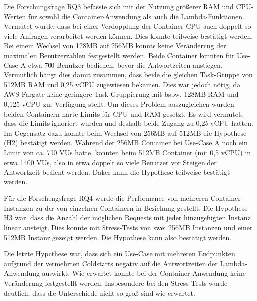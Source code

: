 Die Forschungsfrage RQ3 befasste sich mit der Nutzung größerer RAM und CPU-Werten für sowohl die Container-Anwendung als auch die Lambda-Funktionen. Vermutet wurde, dass bei einer Verdopplung der Container-CPU auch doppelt so viele Anfragen verarbeitet werden können. Dies konnte teilweise bestätigt werden. Bei einem Wechsel von 128MB auf 256MB konnte keine Veränderung der maximalen Benutzerzahlen festgestellt werden. Beide Container konnten für Use-Case A etwa 700 Benutzer bedienen, bevor die Antwortzeiten anstiegen. Vermutlich hängt dies damit zusammen, dass beide die gleichen Task-Gruppe von 512MB RAM und 0,25 vCPU zugewiesen bekamen. Dies war jedoch nötig, da AWS Fargate keine geringere Task-Gruppierung mit bspw. 128MB RAM und 0,125 vCPU zur Verfügung stellt. Um dieses Problem auszugleichen wurden beiden Containern harte Limits für CPU und RAM gesetzt. Es wird vermutet, dass die Limits ignoriert wurden und deshalb beide Zugang zu 0,25 vCPU hatten. Im Gegensatz dazu konnte beim Wechsel von 256MB auf 512MB die Hypothese (H2) bestätigt werden. Während der 256MB Container bei Use-Case A noch ein Limit von ca. 700 VUs hatte, konnten beim 512MB Container (mit 0,5 vCPU) in etwa 1400 VUs, also in etwa doppelt so viele Benutzer vor Steigen der Antwortzeit bedient werden. Daher kann die Hypothese teilweise bestätigt werden.

Für die Forschungsfrage RQ4 wurde die Performance von mehreren Container-Instanzen zu der von einzelnen Containern in Beziehung gestellt. Die Hypothese H3 war, dass die Anzahl der möglichen Requests mit jeder hinzugefügten Instanz linear ansteigt. Dies konnte mit Stress-Tests von zwei 256MB Instanzen und einer 512MB Instanz gezeigt werden. Die Hypothese kann also bestätigt werden.

Die letzte Hypothese war, dass sich ein Use-Case mit mehreren Endpunkten aufgrund der vermehrten Coldstarts negativ auf die Antwortzeiten der Lambda-Anwendung auswirkt. Wie erwartet konnte bei der Container-Anwendung keine Veränderung festgestellt werden.  Insbesondere bei den Stress-Tests wurde deutlich, dass die Unterschiede nicht so groß sind wie erwartet.


